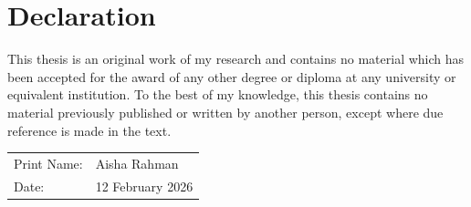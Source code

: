 \chapter*{Declaration}

This thesis is an original work of my research and contains no material which has been accepted for the award of any other degree or diploma at any university or equivalent institution. To the best of my knowledge, this thesis contains no material previously published or written by another person, except where due reference is made in the text.

\vspace{1.2cm}
\noindent
\begin{tabular}{@{}ll@{}}
Print Name: & Aisha Rahman \\[6pt]
Date: & 12 February 2026 \\
\end{tabular}

